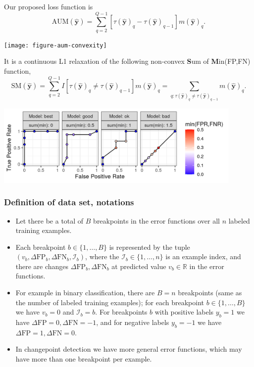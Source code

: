 \documentclass[t]{beamer}
\begin{document}
\begin{frame}
  
\parbox{2.5in}{
  Our proposed loss function is
\begin{equation*}
\label{eq:AUM-computation}
    \text{AUM}(\mathbf {\hat y}) =
    \sum_{q=2}^{Q-1}
    [ \tau(\mathbf {\hat y})_{q} - \tau(\mathbf {\hat y})_{q-1} ]
    m(\mathbf {\hat y})_q.
\end{equation*}
}\parbox{1in}{
  \texttt{[image: figure-aum-convexity]}
}

It is a continuous L1 relaxation of the following non-convex \textbf{S}um of \textbf{M}in(FP,FN) function, 
\begin{equation*}
\label{eq:SM-computation}
    \text{SM}(\mathbf {\hat y}) =
    \sum_{q=2}^{Q-1}
    I[ \tau(\mathbf {\hat y})_{q} \neq \tau(\mathbf {\hat y})_{q-1} ]
    m(\mathbf {\hat y})_q =
    \sum_{q:\tau(\mathbf {\hat y})_{q} \neq \tau(\mathbf {\hat y})_{q-1} }
    m(\mathbf {\hat y})_q.
\end{equation*}

  \includegraphics[width=0.9\textwidth]{figure-more-than-one-binary-dots}
\end{frame}

\begin{frame}
  \frametitle{Definition of data set, notations}

  \begin{itemize}
  \item Let there be a total of $B$ breakpoints in the error functions over
    all $n$ labeled training examples.
  \item Each breakpoint
  $b\in\{1,\dots, B\}$ is represented by the tuple
  $(v_b, \Delta\text{FP}_b, \Delta\text{FN}_b, \mathcal I_b)$, where the
  $\mathcal I_b\in\{1,\dots,n\}$ is an example index, and there are
  changes $\Delta\text{FP}_b, \Delta\text{FN}_b$ at predicted value
  $v_b\in\mathbb R$ in the error functions.
\item For example in binary
  classification, there are $B=n$ breakpoints (same as the number of
  labeled training examples); for each breakpoint $b\in\{1,\dots,B\}$
  we have $v_b=0$ and $\mathcal I_b=b$.  For breakpoints $b$ with
  positive labels $y_b=1$ we have
  $\Delta\text{FP}=0,\Delta\text{FN}=-1$, and for negative labels
  $y_b=-1$ we have $\Delta\text{FP}=1,\Delta\text{FN}=0$.  
\item   In
  changepoint detection we have more general error functions, which
  may have more than one breakpoint per example.
  \end{itemize}
  
\end{frame}
\end{document}
